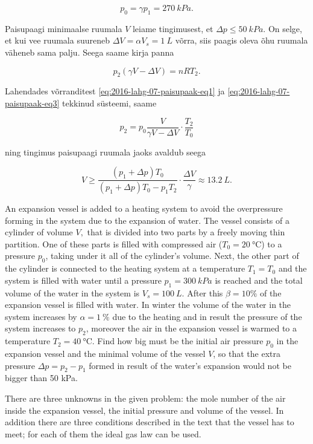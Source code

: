 \[
p_{0}=\gamma p_{1}=\SI{270}{kPa}.
\]


\noindent Paisupaagi minimaalse ruumala $V$ leiame tingimusest, et
$\Delta p\leq\SI{50}{kPa}.$ On selge, et kui vee ruumala suureneb
$\Delta V=\alpha V_{s}=\SI{1}{L}$ võrra, siis paagis oleva õhu ruumala
väheneb sama palju. Seega saame kirja panna

\begin{equation}
p_{2}\left(\gamma V-\Delta V\right)=nRT_{2}.\label{eq:2016-lahg-07-paisupaak-eq3}
\end{equation}


\noindent Lahendades võrranditest \eqref{eq:2016-lahg-07-paisupaak-eq1} ja \eqref{eq:2016-lahg-07-paisupaak-eq3}
tekkinud süsteemi, saame

\[
p_{2}=p_{0}\frac{V}{\gamma V-\Delta V}\cdot\frac{T_{2}}{T_{0}}
\]


\noindent ning tingimus paisupaagi ruumala jaoks avaldub seega

\[
V\geq\frac{\left(p_{1}+\Delta p\right)T_{0}}{\left(p_{1}+\Delta p\right)T_{0}-p_{1}T_{2}}\cdot\frac{\Delta V}{\gamma}\approx\SI{13.2}{L}.
\]

An expansion vessel is added to a heating system to avoid the overpressure forming in the system due to the expansion of water. The vessel consists of a cylinder of volume $V,$ that is divided into two parts by a freely moving thin partition. One of these parts is filled with compressed air ($T_{0}=\SI{20}{\degreeCelsius}$) to a pressure $p_{0}$, taking under it all of the cylinder’s volume. Next, the other part of the cylinder is connected to the heating system at a temperature $T_{1}=T_{0}$ and the system is filled with water until a pressure $p_{1}=\SI{300}{kPa}$ is reached and the total volume of the water in the system is $V_{s}=\SI{100}{L}$. After this $\beta=10\%$ of the expansion vessel is filled with water. In winter the volume of the water in the system increases by $\alpha=\SI{1}{\%}$ due to the heating and in result the pressure of the system increases to $p_{2}$, moreover the air in the expansion vessel is warmed to a temperature $T_{2}=\SI{40}{\degreeCelsius}$. Find how big must be the initial air pressure $p_{0}$ in the expansion vessel and the minimal volume of the vessel $V$, so that the extra pressure $\Delta p=p_{2}-p_{1}$ formed in result of the water’s expansion would not be bigger than 50 kPa.

\hinteng
There are three unknowns in the given problem: the mole number of the air inside the expansion vessel, the initial pressure and volume of the vessel. In addition there are three conditions described in the text that the vessel has to meet; for each of them the ideal gas law can be used.

